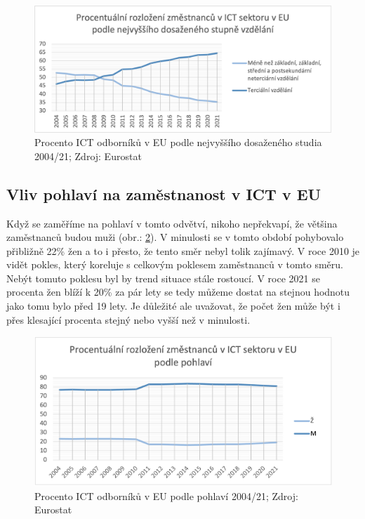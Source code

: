 \documentclass[12pt]{report}			%
\begin{document}
                \begin{figure}[h]
                    \centering
                    \includegraphics[width=16cm]{Maturitni Prace/images/odbornici_ICT_EU_VZ.png} 
                    \caption[Procento ICT odborníků v EU podle nejvyššího dosaženého studia 2004/21]{Procento ICT odborníků v EU podle nejvyššího dosaženého studia 2004/21; Zdroj: Eurostat}
                    \label{fig:odbornici_ICT_EU_VZ}
                \end{figure}
            
        	\subsection{Vliv pohlaví na zaměstnanost v ICT v EU}
                Když se zaměříme na pohlaví v tomto odvětví, nikoho nepřekvapí, že většina zaměstnanců budou muži (obr.: \ref{fig:odbornici_ICT_EU_pohlavi}). V minulosti se v tomto období pohybovalo přibližně 22\% žen a to i přesto, že tento směr nebyl tolik zajímavý. V roce 2010 je vidět pokles, který koreluje s celkovým poklesem zaměstnanců v tomto směru. Nebýt tomuto poklesu byl by trend situace stále rostoucí. V roce 2021 se procenta žen blíží k 20\% za pár lety se tedy můžeme dostat na stejnou hodnotu jako tomu bylo před 19 lety. Je důležité ale uvažovat, že počet žen může být i přes klesající procenta stejný nebo vyšší než v minulosti. \cite{EmployedICTSpecialstBySex}
                \begin{figure}[h]
                    \centering
                    \includegraphics[width=16cm]{Maturitni Prace/images/odbornici_ICT_EU_pohlavi.png} 
                    \caption[Procento ICT odborníků v EU podle pohlaví 2004/21]{Procento ICT odborníků v EU podle pohlaví 2004/21; Zdroj: Eurostat}
                    \label{fig:odbornici_ICT_EU_pohlavi}
                \end{figure}
\end{document}
